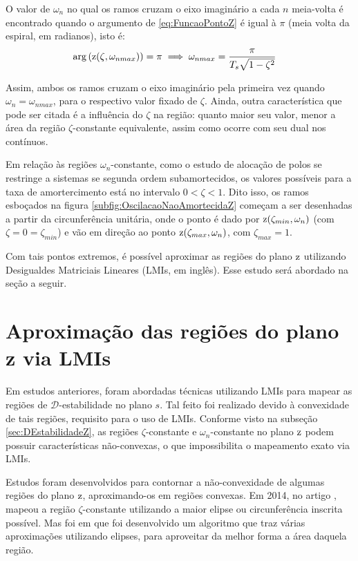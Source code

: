 O valor de $\omega_n$ no qual os ramos cruzam o eixo imaginário a cada $n$ meia-volta é encontrado quando o argumento de \eqref{eq:FuncaoPontoZ} é igual à $\pi$ (meia volta da espiral, em radianos), isto é:
\begin{align}
  \arg{\left(\operatorname{\mathrm{z}}(\zeta,\omega_{nmax})\right)} &= \pi \implies \omega_{nmax} = \dfrac{\pi}{T_s\sqrt{1-\zeta^2}}\label{eq:PontoExtremoZetaZ}
\end{align}

Assim, ambos os ramos cruzam o eixo imaginário pela primeira vez quando $\omega_n = \omega_{nmax}$, para o respectivo valor fixado de $\zeta$. Ainda, outra característica que pode ser citada é a influência do $\zeta$ na região: quanto maior seu valor, menor a área da região $\zeta$-constante equivalente, assim como ocorre com seu dual nos contínuos.

Em relação às regiões $\omega_n$-constante, como o estudo de alocação de polos se restringe a sistemas se segunda ordem subamortecidos\cite{NISE2011,OGATA2011}, os valores possíveis para a taxa de amortercimento está no intervalo $0 < \zeta < 1$. Dito isso, os ramos esboçados na figura \ref{subfig:OscilacaoNaoAmortecidaZ} começam a ser desenhadas a partir da circunferência unitária, onde o ponto é dado por $\operatorname{\mathrm{z}}(\zeta_{min},\omega_n)$ (com $\zeta = 0 = \zeta_{min}$) e vão em direção ao ponto $\operatorname{\mathrm{z}}(\zeta_{max},\omega_n)$, com $\zeta_{max} = 1$.

Com tais pontos extremos, é possível aproximar as regiões do plano $\operatorname{\mathrm{z}}$ utilizando Desigualdes Matriciais Lineares (LMIs, em inglês). Esse estudo será abordado na seção a seguir.

\section{Aproximação das regiões do plano z via LMIs}
Em estudos anteriores, foram abordadas técnicas utilizando LMIs para mapear as regiões de $\mathscr{D}$-estabilidade no plano $s$. Tal feito foi realizado devido à convexidade de tais regiões, requisito para o uso de LMIs. Conforme visto na subseção \ref{sec:DEstabilidadeZ}, as regiões $\zeta$-constante e $\omega_n$-constante no plano $\operatorname{\mathrm{z}}$ podem possuir características não-convexas, o que impossibilita o mapeamento exato via LMIs.

Estudos foram desenvolvidos para contornar a não-convexidade de algumas regiões do plano $\operatorname{\mathrm{z}}$, aproximando-os em regiões convexas. Em 2014, no artigo ,  mapeou a região $\zeta$-constante utilizando a maior elipse ou circunferência inscrita possível. Mas foi em  que foi desenvolvido um algoritmo que traz várias aproximações utilizando elipses, para aproveitar da melhor forma a área daquela região.

